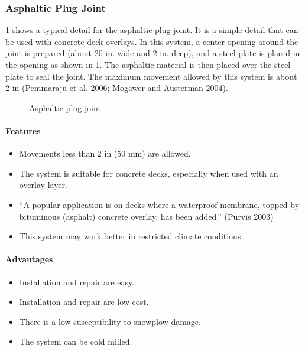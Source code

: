 \subsubsection{Asphaltic Plug Joint}
\cref{fig:asphaltic-plug-joint} shows a typical detail for the asphaltic plug joint. It is a simple detail that can be used with concrete deck
overlays. In this system, a center opening around the joint is prepared (about 20 in. wide and 2 in. deep), and a steel
plate is placed in the opening as shown in \cref{fig:asphaltic-plug-joint}. The asphaltic material is then placed over the steel plate to seal the
joint. The maximum movement allowed by this system is about 2 in (Pemmaraju et al. 2006; Mogawer and
Austerman 2004).

\begin{figure}
  \begin{minipage}{\linewidth}\centering
  \end{minipage}
  \begin{minipage}{\linewidth}\centering
  \end{minipage}
  \caption{Asphaltic plug joint}
  \label{fig:asphaltic-plug-joint}
\end{figure}

\paragraph{Features}
\begin{itemize}
  \item Movements less than 2 in (50 mm) are allowed.
  \item The system is suitable for concrete decks, especially when used with an overlay layer.
  \item “A popular application is on decks where a waterproof membrane, topped by bituminous (asphalt) concrete
  overlay, has been added.” (Purvis 2003)
  \item This system may work better in restricted climate conditions.
\end{itemize}
\paragraph{Advantages}
\begin{itemize}
  \item Installation and repair are easy.
  \item Installation and repair are low cost.
  \item There is a low susceptibility to snowplow damage.
  \item The system can be cold milled.
\end{itemize}
